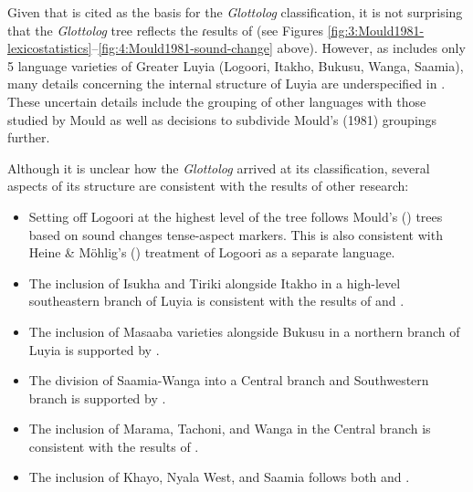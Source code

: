 \documentclass[output=paper]{langscibook}
\begin{document}
Given that \citet{mould_greater_1981} is cited as the basis for the \textit{Glottolog} classification, it is not surprising that the \textit{Glottolog} tree reflects the ɾesults of \citet{mould_greater_1981} (see Figures \ref{fig:3:Mould1981-lexicostatistics}--\ref{fig:4:Mould1981-sound-change} above). However, as \citet{mould_greater_1981} includes only 5 language varieties of Greater Luyia (Logoori, Itakho, Bukusu, Wanga, Saamia), many details concerning the internal structure of Luyia are underspecified in \citet{mould_greater_1981}. These uncertain details include the grouping of other languages with those studied by Mould as well as decisions to subdivide Mould's (1981) groupings further.

Although it is unclear how the \textit{Glottolog} arrived at its classification, several aspects of its structure are consistent with the results of other research:

\begin{itemize}
    \item Setting off Logoori at the highest level of the tree follows Mould's (\citeyear[]{mould_greater_1981}) trees based on sound changes tense-aspect markers. This is also consistent with Heine \& Möhlig's (\citeyear{heine_language_1980}) treatment of Logoori as a separate language.
    
    \item The inclusion of Isukha and Tiriki alongside Itakho in a high-level southeastern branch of Luyia is consistent with the results of \citet{williams_lexico-statistical_1973} and \citet{heine_language_1980}.
    
    \item The inclusion of Masaaba varieties alongside Bukusu in a northern branch of Luyia is supported by \citet{williams_lexico-statistical_1973}.
    
    \item The division of Saamia-Wanga into a Central branch and Southwestern branch is supported by \citet{williams_lexico-statistical_1973}.
    
    \item The inclusion of Marama, Tachoni, and Wanga in the Central branch is consistent with the results of \citet{williams_lexico-statistical_1973}.
    
    \item The inclusion of Khayo, Nyala West, and Saamia follows both \citet{williams_lexico-statistical_1973} and \citet{heine_language_1980}.
\end{itemize}
\end{document}
